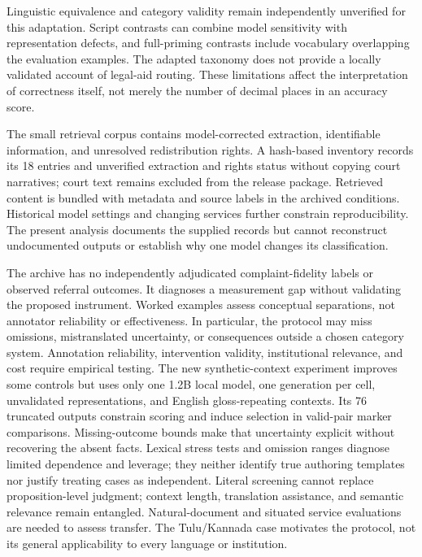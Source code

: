 \documentclass[manuscript,screen,review,anonymous]{acmart}
\begin{document}
Linguistic equivalence and category validity remain independently unverified for this adaptation. Script contrasts can combine model sensitivity with representation defects, and full-priming contrasts include vocabulary overlapping the evaluation examples. The adapted taxonomy does not provide a locally validated account of legal-aid routing. These limitations affect the interpretation of correctness itself, not merely the number of decimal places in an accuracy score.

The small retrieval corpus contains model-corrected extraction, identifiable information, and unresolved redistribution rights. A hash-based inventory records its 18 entries and unverified extraction and rights status without copying court narratives; court text remains excluded from the release package. Retrieved content is bundled with metadata and source labels in the archived conditions. Historical model settings and changing services further constrain reproducibility. The present analysis documents the supplied records but cannot reconstruct undocumented outputs or establish why one model changes its classification.

The archive has no independently adjudicated complaint-fidelity labels or observed referral outcomes. It diagnoses a measurement gap without validating the proposed instrument. Worked examples assess conceptual separations, not annotator reliability or effectiveness. In particular, the protocol may miss omissions, mistranslated uncertainty, or consequences outside a chosen category system. Annotation reliability, intervention validity, institutional relevance, and cost require empirical testing. The new synthetic-context experiment improves some controls but uses only one 1.2B local model, one generation per cell, unvalidated representations, and English gloss-repeating contexts. Its 76 truncated outputs constrain scoring and induce selection in valid-pair marker comparisons. Missing-outcome bounds make that uncertainty explicit without recovering the absent facts. Lexical stress tests and omission ranges diagnose limited dependence and leverage; they neither identify true authoring templates nor justify treating cases as independent. Literal screening cannot replace proposition-level judgment; context length, translation assistance, and semantic relevance remain entangled. Natural-document and situated service evaluations are needed to assess transfer. The Tulu/Kannada case motivates the protocol, not its general applicability to every language or institution.
\end{document}
